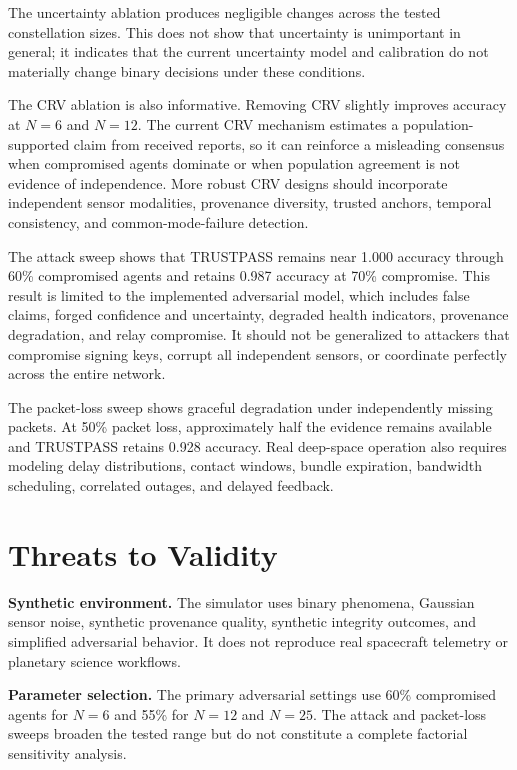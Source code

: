 \documentclass[10pt,conference]{IEEEtran}
\begin{document}
The uncertainty ablation produces negligible changes across the tested constellation sizes. This does not show that uncertainty is unimportant in general; it indicates that the current uncertainty model and calibration do not materially change binary decisions under these conditions.

The CRV ablation is also informative. Removing CRV slightly improves accuracy at $N=6$ and $N=12$. The current CRV mechanism estimates a population-supported claim from received reports, so it can reinforce a misleading consensus when compromised agents dominate or when population agreement is not evidence of independence. More robust CRV designs should incorporate independent sensor modalities, provenance diversity, trusted anchors, temporal consistency, and common-mode-failure detection.

The attack sweep shows that TRUSTPASS remains near 1.000 accuracy through 60\% compromised agents and retains 0.987 accuracy at 70\% compromise. This result is limited to the implemented adversarial model, which includes false claims, forged confidence and uncertainty, degraded health indicators, provenance degradation, and relay compromise. It should not be generalized to attackers that compromise signing keys, corrupt all independent sensors, or coordinate perfectly across the entire network.

The packet-loss sweep shows graceful degradation under independently missing packets. At 50\% packet loss, approximately half the evidence remains available and TRUSTPASS retains 0.928 accuracy. Real deep-space operation also requires modeling delay distributions, contact windows, bundle expiration, bandwidth scheduling, correlated outages, and delayed feedback.

\section{Threats to Validity}
\label{sec:validity}

\textbf{Synthetic environment.}
The simulator uses binary phenomena, Gaussian sensor noise, synthetic provenance quality, synthetic integrity outcomes, and simplified adversarial behavior. It does not reproduce real spacecraft telemetry or planetary science workflows.

\textbf{Parameter selection.}
The primary adversarial settings use 60\% compromised agents for $N=6$ and 55\% for $N=12$ and $N=25$. The attack and packet-loss sweeps broaden the tested range but do not constitute a complete factorial sensitivity analysis.
\end{document}
